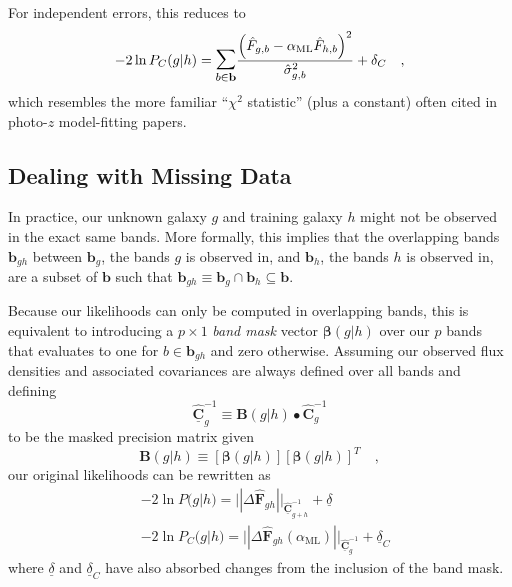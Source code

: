 \documentclass[a4paper,fleqn,usenatbib,english]{mnras}
\newcommand{\rom}[2]{\ensuremath{#1_{\mathrm{#2}}}} %
\newcommand{\pz}{photo-$z$} %
\begin{document}
For independent errors, this reduces to
\begin{equation}
-2\ln P_C(g|h) = \mathlarger{\mathlarger{\sum}}_{b\in\mathbf{b}} \frac{\left(\hat{F}_{g,b}-\rom{\alpha}{ML}\hat{F}_{h,b}\right)^2}{\hat{\sigma}_{g,b}^2} + \delta_C \quad ,
\end{equation}
which resembles the more familiar ``$\chi^2$ statistic'' (plus a constant) often cited in {\pz} model-fitting papers.

\subsection{Dealing with Missing Data}
\label{subsec:miss}

In practice, our unknown galaxy $g$ and training galaxy $h$ might not be observed in the exact same bands. More formally, this implies that the overlapping bands $\mathbf{b}_{gh}$ between $\mathbf{b}_g$, the bands $g$ is observed in, and $\mathbf{b}_h$, the bands $h$ is observed in, are a subset of $\mathbf{b}$ such that $\mathbf{b}_{gh} \equiv \mathbf{b}_g \cap \mathbf{b}_h \subseteq \mathbf{b}$. 

Because our likelihoods can only be computed in overlapping bands, this is equivalent to introducing a $p \times 1$ \textit{band mask} vector $\boldsymbol{\beta}(g|h)$ over our $p$ bands that evaluates to one for $b \in \mathbf{b}_{gh}$ and zero otherwise. Assuming our observed flux densities and associated covariances are always defined over all bands and defining 
\begin{equation}
\underline{\mathbf{\hat{C}}}_{g}^{-1} \equiv \mathbf{B}(g|h) \bullet \mathbf{\hat{C}}_{g}^{-1}
\end{equation}
to be the masked precision matrix given
\begin{equation}
\mathbf{B}(g|h) \equiv \left[\boldsymbol{\beta}(g|h)\right]\left[\boldsymbol{\beta}(g|h)\right]^T \quad ,
\end{equation}
our original likelihoods can be rewritten as
\begin{align}
&-2 \ln P(g|h) = ||\Delta\mathbf{\hat{F}}_{gh}||_{\underline{\mathbf{\hat{C}}}_{g+h}^{-1}} + \underline{\delta} \\
&-2 \ln P_C(g|h) = ||\Delta\mathbf{\hat{F}}_{gh}(\rom{\alpha}{ML})||_{\underline{\mathbf{\hat{C}}}_{g}^{-1}} + \underline{\delta}_C
\end{align}
where $\underline{\delta}$ and $\underline{\delta}_C$ have also absorbed changes from the inclusion of the band mask.
\end{document}
